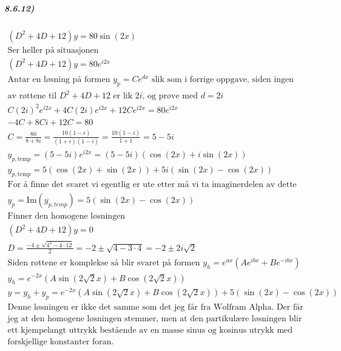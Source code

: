 \documentclass[11pt, A4paper,norsk]{article}
\begin{document}
			\subparagraph{8.6.12)}
				\begin{gather*}
(D^2 + 4D + 12)y = 80 \sin(2x) \\
\text{Ser heller på situasjonen} \\
(D^2 + 4D + 12)y = 80 e^{i2x} \\
\text{Antar en løsning på formen $y_p = Ce^{dx}$ slik som i forrige oppgave, siden ingen} \\
\text{av røttene til $D^2 + 4D + 12$ er lik $2i$, og prøve med $d = 2i$} \\
C (2i)^2 e^{i2x} + 4C(2i)e^{i2x} + 12Ce^{i2x} = 80 e^{i2x} \\
- 4 C + 8 C i + 12 C = 80 \\
C = \frac{80}{8 + 8i} = \frac{10(1 - i)}{(1 + i)(1 - i)} = \frac{10(1 - i)}{1 + 1} = 5 - 5i \\
y_{p, \text{temp}} = (5 - 5i) e^{i2x} = (5 - 5i)(\cos(2x) + i\sin(2x)) \\
y_{p, \text{temp}} = 5 ( \cos(2x) + \sin(2x) ) + 5i ( \sin(2x) - \cos(2x) ) \\
\text{For å finne det svaret vi egentlig er ute etter må vi ta imaginerdelen av dette} \\
y_p = \text{Im}(y_{p,temp}) = 5 ( \sin(2x) - \cos(2x) ) \\
\text{Finner den homogene løsningen} \\
(D^2 + 4D + 12)y = 0 \\
D = \frac{-4 \pm \sqrt{4^2 - 4 \cdot 12}}{2} = -2 \pm \sqrt{4 - 3 \cdot 4} = - 2 \pm 2 i \sqrt{2} \\
\text{Siden røttene er komplekse så blir svaret på formen $y_h = e^{ax}(Ae^{ibx} + Be^{-ibx})$} \\
y_h = e^{-2 x}( A \sin(2 \sqrt{2} x) + B\cos(2 \sqrt{2} x) ) \\
y = y_h + y_p = e^{-2 x}\left( A \sin(2 \sqrt{2} x) + B\cos(2 \sqrt{2} x) \right) + 5 \left( \sin(2x) - \cos(2x) \right) \\
\text{Denne løsningen er ikke det samme som det jeg får fra Wolfram Alpha. Der får} \\
\text{jeg at den homogene løsningen stemmer, men at den partikulære løsningen blir} \\
\text{ett kjempelangt uttrykk bestående av en masse sinus og kosinus utrykk med} \\
\text{forskjellige konstanter foran.}
				\end{gather*}
\end{document}
